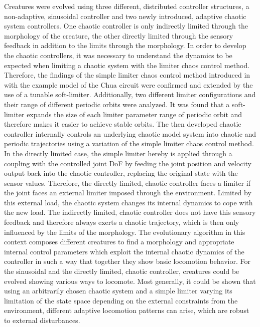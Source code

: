 \documentclass[main]{subfiles}
\begin{document}
Creatures were evolved using three different, distributed controller structures, a non-adaptive, sinusoidal controller and two newly introduced, adaptive chaotic system controllers. %
%
One chaotic controller is only indirectly limited through the morphology of the creature, the other directly limited through the sensory feedback in addition to the limits through the morphology. %
%
In order to develop the chaotic controllers, it was necessary to understand the dynamics to be expected when limiting a chaotic system with the limiter chaos control method. %
%
Therefore, the findings of the simple limiter chaos control method introduced in \cite{bib:Corron2000} with the example model of the Chua circuit \cite{bib:Matsumoto1985} were confirmed and extended by the use of a tunable soft-limiter. %
%
Additionally, two different limiter configurations and their range of different periodic orbits were analyzed. %
%
It was found that a soft-limiter expands the size of each limiter parameter range of periodic orbit and therefore makes it easier to achieve stable orbits. %
%
The then developed chaotic controller internally controls an underlying chaotic model system into chaotic and periodic trajectories using a variation of the simple limiter chaos control method. %
%
In the directly limited case, the simple limiter hereby is applied through a coupling with the controlled joint DoF by feeding the joint position and velocity output back into the chaotic controller, replacing the original state with the sensor values. %
%
Therefore, the directly limited, chaotic controller faces a limiter if the joint faces an external limiter imposed through the environment. %
%
Limited by this external load, the chaotic system changes its internal dynamics to cope with the new load. %
%
The indirectly limited, chaotic controller does not have this sensory feedback and therefore always exerts a chaotic trajectory, which is then only influenced by the limits of the morphology.%
%
The evolutionary algorithm in this context composes different creatures to find a morphology and appropriate internal control parameters which exploit the internal chaotic dynamics of the controller in such a way that together they show basic locomotion behavior. %
%
For the sinusoidal and the directly limited, chaotic controller, creatures could be evolved showing various ways to locomote. %
%
Most generally, it could be shown that using an arbitrarily chosen chaotic system and a simple limiter varying its limitation of the state space depending on the external constraints from the environment, different adaptive locomotion patterns can arise, which are robust to external disturbances. %
\end{document}
